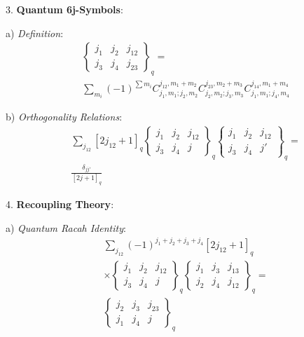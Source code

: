 \documentclass[12pt,a4paper]{article}
\begin{document}
3. \textbf{Quantum 6j-Symbols}:
   
   a) \textit{Definition}:
      \[
      \begin{aligned}
      &\begin{Bmatrix} j_1 & j_2 & j_{12} \\ j_3 & j_4 & j_{23} \end{Bmatrix}_q = \\
      &\sum_{m_i} (-1)^{\sum m_i} C^{j_{12},m_1+m_2}_{j_1,m_1;j_2,m_2} C^{j_{23},m_2+m_3}_{j_2,m_2;j_3,m_3} C^{j_{14},m_1+m_4}_{j_1,m_1;j_4,m_4}
      \end{aligned}
      \]
   
   b) \textit{Orthogonality Relations}:
      \[
      \begin{aligned}
      &\sum_{j_{12}} [2j_{12}+1]_q \begin{Bmatrix} j_1 & j_2 & j_{12} \\ j_3 & j_4 & j \end{Bmatrix}_q \begin{Bmatrix} j_1 & j_2 & j_{12} \\ j_3 & j_4 & j' \end{Bmatrix}_q = \\
      &\frac{\delta_{jj'}}{[2j+1]_q}
      \end{aligned}
      \]

4. \textbf{Recoupling Theory}:
   
   a) \textit{Quantum Racah Identity}:
      \[
      \begin{aligned}
      &\sum_{j_{12}} (-1)^{j_1+j_2+j_3+j_4} [2j_{12}+1]_q \\
      &\times \begin{Bmatrix} j_1 & j_2 & j_{12} \\ j_3 & j_4 & j \end{Bmatrix}_q \begin{Bmatrix} j_1 & j_3 & j_{13} \\ j_2 & j_4 & j_{12} \end{Bmatrix}_q = \\
      &\begin{Bmatrix} j_2 & j_3 & j_{23} \\ j_1 & j_4 & j \end{Bmatrix}_q
      \end{aligned}
      \]
   
\end{document}
